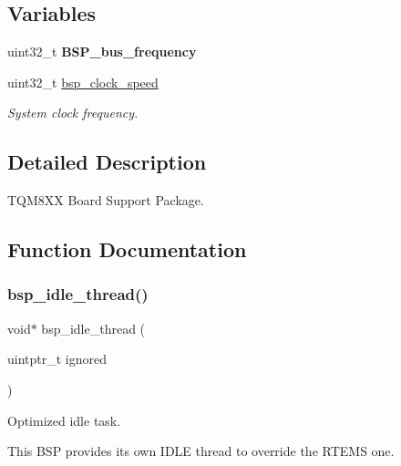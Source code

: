 \subsection*{Variables}
\begin{DoxyCompactItemize}
\item 
\mbox{\label{group__RTEMSBSPsPowerPCTQM8XX_gaf366f38cbf1842979ad68538f1e61303}} 
uint32\+\_\+t {\bfseries B\+S\+P\+\_\+bus\+\_\+frequency}
\item 
\mbox{\label{group__RTEMSBSPsPowerPCTQM8XX_gad74f56ed41b30c182c84b50f023e2ca5}} 
uint32\+\_\+t \mbox{\hyperlink{group__RTEMSBSPsPowerPCTQM8XX_gad74f56ed41b30c182c84b50f023e2ca5}{bsp\+\_\+clock\+\_\+speed}}
\begin{DoxyCompactList}\small\item\em System clock frequency. \end{DoxyCompactList}\end{DoxyCompactItemize}


\subsection{Detailed Description}
T\+Q\+M8\+XX Board Support Package. 



\subsection{Function Documentation}
\mbox{\label{group__RTEMSBSPsPowerPCTQM8XX_ga301be7085b80c41a9c5887247003c662}} 
\subsubsection{\texorpdfstring{bsp\_idle\_thread()}{bsp\_idle\_thread()}}
{\footnotesize\ttfamily void$\ast$ bsp\+\_\+idle\+\_\+thread (\begin{DoxyParamCaption}\item[{uintptr\+\_\+t}]{ignored }\end{DoxyParamCaption})}



Optimized idle task. 

This B\+SP provides its own I\+D\+LE thread to override the R\+T\+E\+MS one.

